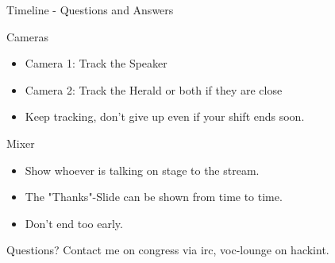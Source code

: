 \documentclass[aspectratio=169]{beamer}
\begin{document}
\begin{frame}{Timeline - Questions and Answers}
	\begin{block}{Cameras}
		\begin{itemize}
			\item Camera 1: Track the Speaker
			\item Camera 2: Track the Herald or both if they are close
			\item Keep tracking, don't give up even if your shift ends soon.
		\end{itemize}
	\end{block}
	
	\begin{block}{Mixer}
		\begin{itemize}
			\item Show whoever is talking on stage to the stream.
			\item The "Thanks"-Slide can be shown from time to time.
			\item Don't end too early.
		\end{itemize}
	\end{block}
\end{frame}


\begin{frame}{Questions?}
Contact me on congress via irc, voc-lounge on hackint.
\end{frame}
\end{document}
